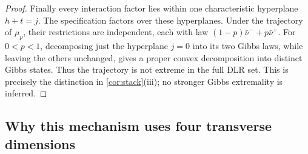 \begin{proof}
Finally every interaction factor lies within one characteristic hyperplane $h+t=j$. The specification factors over these hyperplanes. Under the trajectory of $\mu_p$, their restrictions are independent, each with law $(1-p)\bar\nu^-+p\bar\nu^+$. For $0<p<1$, decomposing just the hyperplane $j=0$ into its two Gibbs laws, while leaving the others unchanged, gives a proper convex decomposition into distinct Gibbs states. Thus the trajectory is not extreme in the full DLR set. This is precisely the distinction in \cref{cor:stack}(iii); no stronger Gibbs extremality is inferred.
\end{proof}

\subsection{Why this mechanism uses four transverse dimensions}

